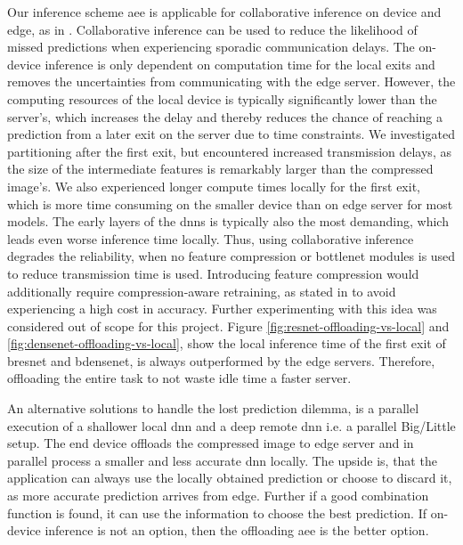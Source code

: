 Our inference scheme \gls{aee} is applicable for collaborative inference on device and edge, as in \cite{leroux_cascading_2017,teerapittayanon_distributed_2017}. Collaborative inference can be used to reduce the likelihood of missed predictions when experiencing sporadic communication delays. The on-device inference is only dependent on computation time for the local exits and removes the uncertainties from communicating with the edge server. However, the computing resources of the local device is typically significantly lower than the server's, which increases the delay and thereby reduces the chance of reaching a prediction from a later exit on the server due to time constraints. We investigated partitioning after the first exit, but encountered increased transmission delays, as the size of the intermediate features is remarkably larger than the compressed image's. We also experienced longer compute times locally for the first exit, which is more time consuming on the smaller device than on edge server for most models. The early layers of the \gls{dnn}s is typically also the most demanding, which leads even worse inference time locally. Thus, using collaborative inference degrades the reliability, when no feature compression or \gls{bottlenet} modules is used to reduce transmission time is used. Introducing feature compression would additionally require compression-aware retraining, as stated in \cite{choi_near-lossless_2018,choi_near-lossless_2018,eshratifar_bottlenet:_2019}  to avoid experiencing a high cost in accuracy. Further experimenting with this idea was considered out of scope for this project. Figure \ref{fig:resnet-offloading-vs-local} and \ref{fig:densenet-offloading-vs-local}, show the local inference time of the first exit of \gls{bresnet} and \gls{bdensenet}, is always outperformed by the edge servers. Therefore, offloading the entire task to not waste idle time a faster server.

An alternative solutions to handle the lost prediction dilemma, is a parallel execution of a shallower local \gls{dnn} and a deep remote \gls{dnn} i.e. a parallel Big/Little setup. The end device offloads the compressed image to edge server and in parallel process a smaller and less accurate \gls{dnn} locally. The upside is, that the application can always use the locally obtained prediction or choose to discard it, as more accurate prediction arrives from edge. Further if a good combination function is found, it can use the information to choose the best prediction. If on-device inference is not an option, then the offloading \gls{aee} is the better option.

